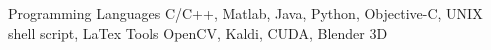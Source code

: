 


\begin{cvskills}


\cvskill
{Programming Languages} %
{C/C++, Matlab, Java, Python, Objective-C, UNIX shell script, LaTex} %
\cvskill
{Tools} %
{OpenCV, Kaldi, CUDA, Blender 3D} %





\end{cvskills}